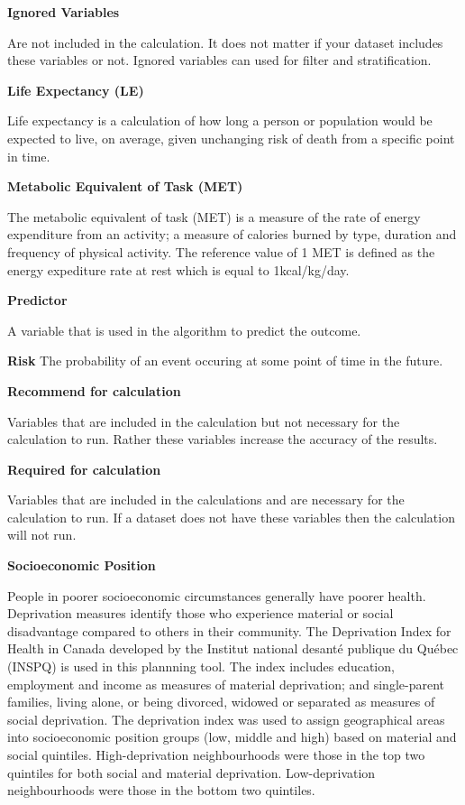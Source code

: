 \documentclass[]{book}
\begin{document}
\textbf{Ignored Variables}

Are not included in the calculation. It does not matter if your dataset
includes these variables or not. Ignored variables can used for filter
and stratification.

\textbf{Life Expectancy (LE)}

Life expectancy is a calculation of how long a person or
population would be expected to live, on average, given unchanging risk
of death from a specific point in time.

\textbf{Metabolic Equivalent of Task (MET)}

The metabolic equivalent of task (MET) is a measure of the rate of
energy expenditure from an activity; a measure of calories burned by
type, duration and frequency of physical activity. The reference value
of 1 MET is defined as the energy expediture rate at rest which is equal
to 1kcal/kg/day.

\textbf{Predictor}

A variable that is used in the algorithm to predict the outcome.

\textbf{Risk} The probability of an event occuring at some point of time
in the future.

\textbf{Recommend for calculation}

Variables that are included in the calculation but not necessary for the
calculation to run. Rather these variables increase the accuracy of the
results.

\textbf{Required for calculation}

Variables that are included in the calculations and are necessary for
the calculation to run. If a dataset does not have these variables then
the calculation will not run.

\textbf{Socioeconomic Position}

People in poorer socioeconomic circumstances generally have poorer
health. Deprivation measures identify those who experience material or
social disadvantage compared to others in their community. The
Deprivation Index for Health in Canada developed by the Institut
national desanté publique du Québec (INSPQ)\citep{INSPQ2000} is used in
this plannning tool. The index includes education, employment and income
as measures of material deprivation; and single-parent families, living
alone, or being divorced, widowed or separated as measures of social
deprivation. The deprivation index was used to assign geographical areas
into socioeconomic position groups (low, middle and high) based on
material and social quintiles. High-deprivation neighbourhoods were
those in the top two quintiles for both social and material deprivation.
Low-deprivation neighbourhoods were those in the bottom two quintiles.
\end{document}
